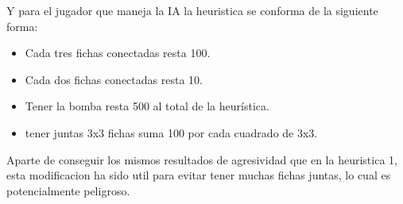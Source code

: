 	Y para el jugador que maneja la IA la heuristica se conforma de la siguiente forma:
	
	\begin{itemize}
		\item Cada tres fichas conectadas resta 100.
		\item Cada dos fichas conectadas resta 10.
		\item Tener la bomba resta 500 al total de la heurística.
		\item tener juntas 3x3 fichas suma 100 por cada cuadrado de 3x3.
	\end{itemize}

	Aparte de conseguir los mismos resultados de agresividad que en la heuristica 1, esta modificacion ha sido util para evitar tener muchas fichas juntas, lo cual es potencialmente peligroso.